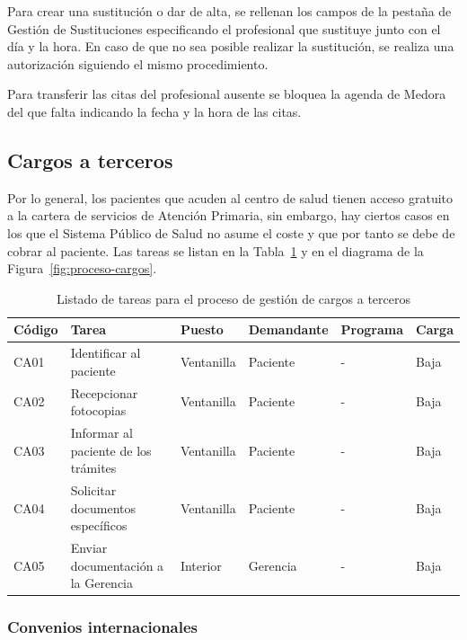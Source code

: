 Para crear una sustitución o dar de alta, se rellenan los campos de la pestaña de Gestión de Sustituciones especificando el profesional que sustituye junto con el día y la hora. En caso de que no sea posible realizar la sustitución, se realiza una autorización siguiendo el mismo procedimiento.

Para transferir las citas del profesional ausente se bloquea la agenda de Medora del que falta indicando la fecha y la hora de las citas.

\subsection{Cargos a terceros}

Por lo general, los pacientes que acuden al centro de salud tienen acceso gratuito a la cartera de servicios de Atención Primaria, sin embargo, hay ciertos casos en los que el Sistema Público de Salud no asume el coste y que por tanto se debe de cobrar al paciente. Las tareas se listan en la Tabla~\ref{tab:proceso-cargos} y en el diagrama de la Figura~\ref{fig:proceso-cargos}.

\begin{table}[H]
    \begin{tabular}{lp{5cm}llll}
        \toprule
        Código & Tarea                                & Puesto     & Demandante & Programa & Carga \\
        \midrule
        CA01   & Identificar al paciente              & Ventanilla & Paciente   & -        & Baja  \\
        CA02   & Recepcionar fotocopias               & Ventanilla & Paciente   & -        & Baja  \\
        CA03   & Informar al paciente de los trámites & Ventanilla & Paciente   & -        & Baja  \\
        CA04   & Solicitar documentos específicos     & Ventanilla & Paciente   & -        & Baja  \\
        CA05   & Enviar documentación a la Gerencia   & Interior   & Gerencia   & -        & Baja  \\
        \bottomrule
    \end{tabular}
    \caption{Listado de tareas para el proceso de gestión de cargos a terceros}
    \label{tab:proceso-cargos}
\end{table}

\subsubsection{Convenios internacionales}

